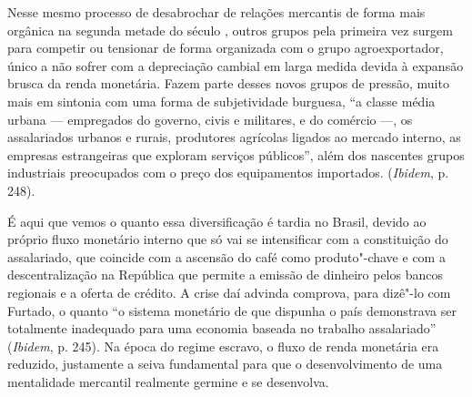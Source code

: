 Nesse mesmo processo de desabrochar de relações mercantis de forma mais
orgânica na segunda metade do século , outros grupos pela primeira
vez surgem para competir ou tensionar de forma organizada com o grupo
agroexportador, único a não sofrer com a depreciação cambial em larga
medida devida à expansão brusca da renda monetária. Fazem parte desses
novos grupos de pressão, muito mais em sintonia com uma forma de
subjetividade burguesa, ``a classe média urbana --- empregados do
governo, civis e militares, e do comércio ---, os assalariados urbanos e
rurais, produtores agrícolas ligados ao mercado interno, as empresas
estrangeiras que exploram serviços públicos'', além dos nascentes grupos
industriais preocupados com o preço dos equipamentos importados.
(\emph{Ibidem}, p. 248).

É aqui que vemos o quanto essa diversificação é tardia no Brasil, devido
ao próprio fluxo monetário interno que só vai se intensificar com a
constituição do assalariado, que coincide com a ascensão do café como
produto"-chave e com a descentralização na República que permite a
emissão de dinheiro pelos bancos regionais e a oferta de crédito. A
crise daí advinda comprova, para dizê"-lo com Furtado, o quanto ``o sistema monetário de que dispunha o país demonstrava ser totalmente
inadequado para uma economia baseada no trabalho assalariado''
(\emph{Ibidem}, p. 245). Na época do regime escravo, o fluxo de renda
monetária era reduzido, justamente a seiva fundamental para que o desenvolvimento
de uma mentalidade mercantil realmente germine e se desenvolva.

